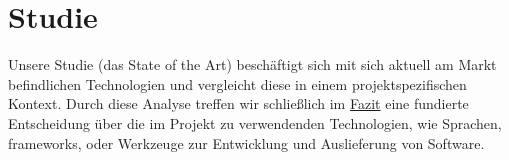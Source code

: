 \chapter{Studie}

Unsere Studie (das State of the Art) beschäftigt sich mit sich aktuell am Markt befindlichen Technologien und vergleicht diese in einem projektspezifischen Kontext. Durch diese Analyse treffen wir schließlich im \hyperref[sec:fazit]{Fazit} eine fundierte Entscheidung über die im Projekt zu verwendenden Technologien, wie Sprachen, \gls{framework}s, oder Werkzeuge zur Entwicklung und Auslieferung von Software.